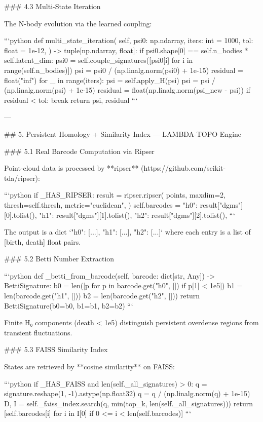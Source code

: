 ### 4.3 Multi-State Iteration

The N-body evolution via the learned coupling:

```python
def multi_state_iteration(
    self,
    psi0: np.ndarray,
    iters: int = 1000,
    tol: float = 1e-12,
) -> tuple[np.ndarray, float]:
    if psi0.shape[0] == self.n_bodies * self.latent_dim:
        psi0 = self.couple_signatures([psi0[i] for i in range(self.n_bodies)])
    psi = psi0 / (np.linalg.norm(psi0) + 1e-15)
    residual = float("inf")
    for _ in range(iters):
        psi = self.apply_H(psi)
        psi = psi / (np.linalg.norm(psi) + 1e-15)
        residual = float(np.linalg.norm(psi_new - psi))
        if residual < tol:
            break
    return psi, residual
```

---

## 5. Persistent Homology + Similarity Index — LAMBDA-TOPO Engine

### 5.1 Real Barcode Computation via Ripser

Point-cloud data is processed by **ripser** (https://github.com/scikit-tda/ripser):

```python
if _HAS_RIPSER:
    result = ripser.ripser(
        points,
        maxdim=2,
        thresh=self.thresh,
        metric="euclidean",
    )
    self.barcodes = {
        "h0": result["dgms"][0].tolist(),
        "h1": result["dgms"][1].tolist(),
        "h2": result["dgms"][2].tolist(),
    }
```

The output is a dict `{"h0": [...], "h1": [...], "h2": [...]}` where each entry is a list of [birth, death] float pairs.

### 5.2 Betti Number Extraction

```python
def _betti_from_barcode(self, barcode: dict[str, Any]) -> BettiSignature:
    b0 = len([p for p in barcode.get("h0", []) if p[1] < 1e5])
    b1 = len(barcode.get("h1", []))
    b2 = len(barcode.get("h2", []))
    return BettiSignature(b0=b0, b1=b1, b2=b2)
```

Finite H₀ components (death < 1e5) distinguish persistent overdense regions from transient fluctuations.

### 5.3 FAISS Similarity Index

States are retrieved by **cosine similarity** on FAISS:

```python
if _HAS_FAISS and len(self._all_signatures) > 0:
    q = signature.reshape(1, -1).astype(np.float32)
    q = q / (np.linalg.norm(q) + 1e-15)
    D, I = self._faiss_index.search(q, min(top_k, len(self._all_signatures)))
    return [self.barcodes[i] for i in I[0] if 0 <= i < len(self.barcodes)]
```


